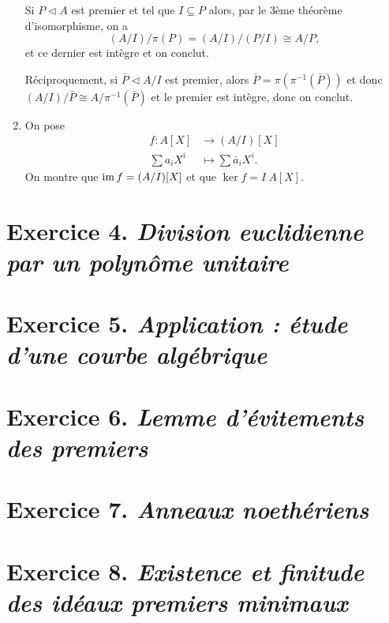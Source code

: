 \documentclass[./main]{subfiles}
\begin{document}
\begin{enumerate}
      Si $P \triangleleft A$ est premier et tel que  $I \subseteq P$ alors, par le 3ème théorème d'isomorphisme, on a \[
        (A / I) / \pi(P) = (A / I) / (P / I) \cong A / P
      ,\] et ce dernier est intègre et on conclut.

      Réciproquement, si $\bar{P} \triangleleft A / I$ est premier, alors $\bar{P} = \pi(\pi^{-1}(\bar{P}))$ et donc $(A / I) / \bar{P} \cong A / \pi^{-1}(\bar{P})$ et le premier est intègre, donc on conclut.
    \item On pose \begin{align*}
          f: A[X] &\longrightarrow (A / I)[X] \\
        \sum a_i X^i &\longmapsto \sum \bar{a}_i X^i
      .\end{align*}
      On montre que $\operatorname{im} f = (A / I)[X]$ et que  $\ker f = I \: A[X]$.
  \end{enumerate}

  \section{Exercice 4. \textit{Division euclidienne par un polynôme unitaire}}

  \section{Exercice 5. \textit{Application : étude d'une courbe algébrique}}

  \section{Exercice 6. \textit{Lemme d'évitements des premiers}}

  \section{Exercice 7. \textit{Anneaux noethériens}}

  \section{Exercice 8. \textit{Existence et finitude des idéaux premiers minimaux}}
\end{document}
